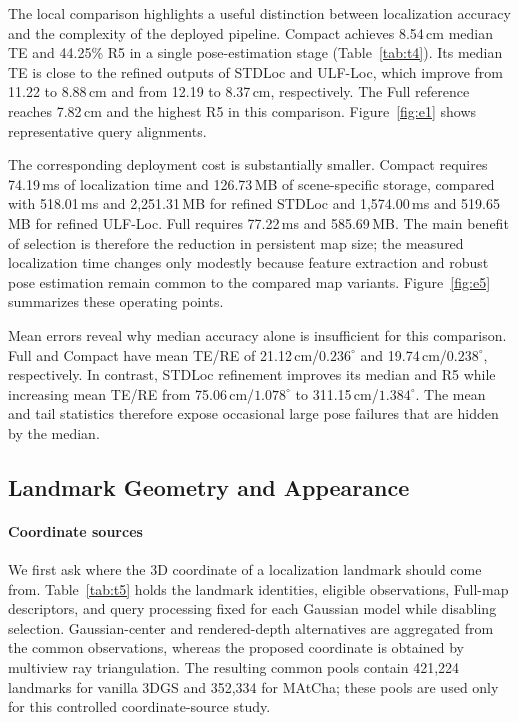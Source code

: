 The local comparison highlights a useful distinction between localization accuracy and the complexity of the deployed pipeline. Compact achieves 8.54\,cm median TE and 44.25\% R5 in a single pose-estimation stage (Table~\ref{tab:t4}). Its median TE is close to the refined outputs of STDLoc and ULF-Loc, which improve from 11.22 to 8.88\,cm and from 12.19 to 8.37\,cm, respectively. The Full reference reaches 7.82\,cm and the highest R5 in this comparison. Figure~\ref{fig:e1} shows representative query alignments.

The corresponding deployment cost is substantially smaller. Compact requires 74.19\,ms of localization time and 126.73\,MB of scene-specific storage, compared with 518.01\,ms and 2,251.31\,MB for refined STDLoc and 1,574.00\,ms and 519.65\,MB for refined ULF-Loc. Full requires 77.22\,ms and 585.69\,MB. The main benefit of selection is therefore the reduction in persistent map size; the measured localization time changes only modestly because feature extraction and robust pose estimation remain common to the compared map variants. Figure~\ref{fig:e5} summarizes these operating points.

Mean errors reveal why median accuracy alone is insufficient for this comparison. Full and Compact have mean TE/RE of 21.12\,cm/$0.236^\circ$ and 19.74\,cm/$0.238^\circ$, respectively. In contrast, STDLoc refinement improves its median and R5 while increasing mean TE/RE from 75.06\,cm/$1.078^\circ$ to 311.15\,cm/$1.384^\circ$. The mean and tail statistics therefore expose occasional large pose failures that are hidden by the median.

\subsection{Landmark Geometry and Appearance}
\label{sec:construction-results}



\paragraph{Coordinate sources}
We first ask where the 3D coordinate of a localization landmark should come from. Table~\ref{tab:t5} holds the landmark identities, eligible observations, Full-map descriptors, and query processing fixed for each Gaussian model while disabling selection. Gaussian-center and rendered-depth alternatives are aggregated from the common observations, whereas the proposed coordinate is obtained by multiview ray triangulation. The resulting common pools contain 421,224 landmarks for vanilla 3DGS and 352,334 for MAtCha; these pools are used only for this controlled coordinate-source study.

